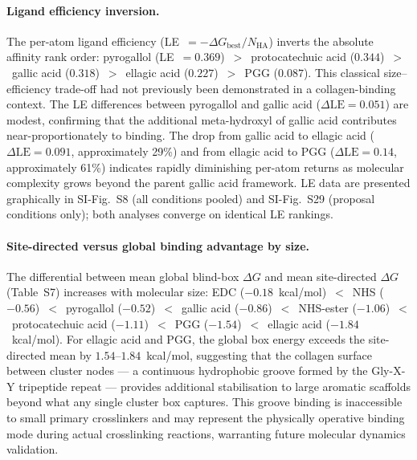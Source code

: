 \documentclass[11pt]{article}
\begin{document}
\paragraph{Ligand efficiency inversion.}
The per-atom ligand efficiency (LE~$= -\Delta G_\mathrm{best}/N_\mathrm{HA}$)
inverts the absolute affinity rank order:
pyrogallol (LE~$= 0.369$)~$>$~protocatechuic acid ($0.344$)~$>$~gallic acid
($0.318$)~$>$~ellagic acid ($0.227$)~$>$~PGG ($0.087$).
This classical size--efficiency trade-off had not previously been demonstrated
in a collagen-binding context.
The LE differences between pyrogallol and gallic acid
($\Delta\mathrm{LE} = 0.051$) are modest, confirming that the additional
meta-hydroxyl of gallic acid contributes near-proportionately to binding.
The drop from gallic acid to ellagic acid ($\Delta\mathrm{LE} = 0.091$,
approximately 29\%) and from ellagic acid to PGG ($\Delta\mathrm{LE} = 0.14$,
approximately 61\%) indicates rapidly diminishing per-atom returns as molecular
complexity grows beyond the parent gallic acid framework.
LE data are presented graphically in SI-Fig.~S8 (all conditions pooled)
and SI-Fig.~S29 (proposal conditions only); both analyses converge on
identical LE rankings.

\paragraph{Site-directed versus global binding advantage by size.}
The differential between mean global blind-box $\Delta G$ and mean
site-directed $\Delta G$ (Table~S7) increases with molecular size:
EDC ($-0.18$~kcal/mol)~$<$~NHS ($-0.56$)~$<$~pyrogallol ($-0.52$)~$<$~gallic
acid ($-0.86$)~$<$~NHS-ester ($-1.06$)~$<$~protocatechuic acid
($-1.11$)~$<$~PGG ($-1.54$)~$<$~ellagic acid ($-1.84$~kcal/mol).
For ellagic acid and PGG, the global box energy exceeds the site-directed mean
by $1.54$--$1.84$~kcal/mol, suggesting that the collagen surface between
cluster nodes --- a continuous hydrophobic groove formed by the Gly-X-Y
tripeptide repeat --- provides additional stabilisation to large aromatic
scaffolds beyond what any single cluster box captures.
This groove binding is inaccessible to small primary crosslinkers and may
represent the physically operative binding mode during actual crosslinking
reactions, warranting future molecular dynamics validation.
\end{document}
